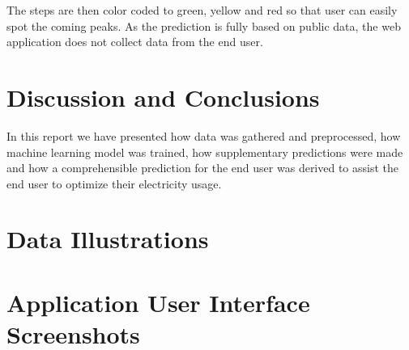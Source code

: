 \documentclass{article}
\begin{document}
The steps are then color coded to green, yellow and red so that user can easily spot the coming peaks. As the prediction is fully based on public data, the web application does not collect data from the end user.

\section{Discussion and Conclusions}
\label{section:conclusions}

In this report we have presented how data was gathered and preprocessed, how machine learning model was trained, how supplementary predictions were made and how a comprehensible prediction for the end user was derived to assist the end user to optimize their electricity usage. 



\appendix
\section{Data Illustrations}

\label{section:appendixa}

\section{Application User Interface Screenshots}

\label{section:appendixb}
\end{document}
